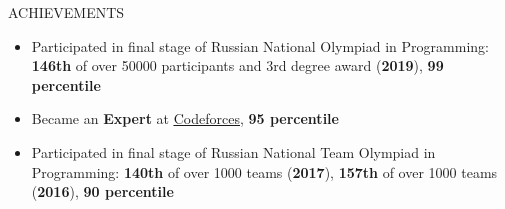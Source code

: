 \documentclass{resume} %
\begin{document}
\begin{rSection}{ACHIEVEMENTS} 
\begin{itemize}
    \item Participated in final stage of Russian National Olympiad in Programming: \textbf{146th} of over 50000 participants and 3rd degree award (\textbf{2019}), \textbf{99 percentile} %
    \item Became an \textbf{Expert} at \href{http://codeforces.com/profile/n2k}{\underline{Codeforces}}, \textbf{95 percentile}
    \item Participated in final stage of Russian National Team Olympiad in Programming: \textbf{140th} of over 1000 teams (\textbf{2017}), \textbf{157th} of over 1000 teams (\textbf{2016}), \textbf{90 percentile}
\end{itemize}
\end{rSection}
\end{document}
